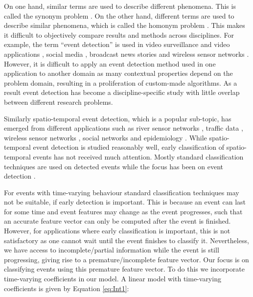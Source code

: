 \documentclass[11pt]{article}
\begin{document}
	On one hand, similar terms are used to describe different phenomena. This is called the synonym problem \cite{zhou2014spatiotemporal}. On the other hand, different terms are used to describe similar phenomena, which is called the homonym problem \cite{zhou2014spatiotemporal}. This makes it difficult to objectively compare results and methods across disciplines. For example, the term ``event detection'' is used in video surveillance and video applications \cite{adam2008robust, ke2005efficient, medioni2001event}, social media \cite{weng2011event, li2012tedas, abdelhaq2013eventweet}, broadcast news stories \cite{allan1998line, li2005probabilistic} and wireless sensor networks \cite{yin2009spatio, mao2015online}. However, it is difficult to apply an event detection method used in one application to another domain as many contextual properties depend on the problem domain, resulting in a proliferation of custom-made algorithms. As a result event detection has become a discipline-specific study with little overlap between different research problems. 
	
	Similarly spatio-temporal event detection, which is a popular sub-topic, has emerged from different applications such as river sensor networks \cite{mao2015online}, traffic data \cite{souto2016event}, wireless sensor networks \cite{mousavi2013spatio}, social networks \cite{cheng2014event} and epidemiology \cite{gomide2011dengue}. While spatio-temporal event detection is  studied reasonably well, early classification of spatio-temporal events has not received much attention. Mostly standard classification techniques are used on detected events while the focus has been on event detection \cite{kang2014detecting}. 
	
	
	For events with time-varying behaviour standard classification techniques may not be suitable, if early detection is important. This is because an event can last for some time and  event features may change as the event progresses, such that an accurate feature vector can only be computed after the event is finished. However, for applications where early classification is important, this is not satisfactory as one cannot wait until the event  finishes to classify it.  Nevertheless, we have access to incomplete/partial information while the event is still progressing,  giving rise to a premature/incomplete feature vector. Our focus is on classifying events using this premature feature vector.  To do this we incorporate time-varying coefficients in our model. A linear model with time-varying coefficients is given by Equation \eqref{eq:Int1}:
	
\end{document}
